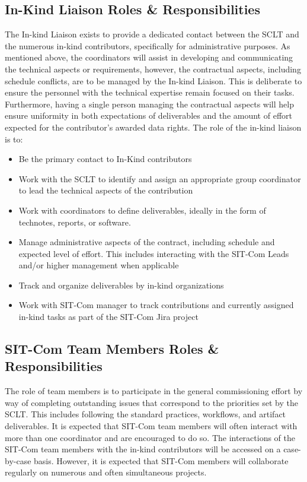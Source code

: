 \documentclass[SE,lsstdraft,authoryear,toc]{lsstdoc}
\begin{document}
\subsection{In-Kind Liaison Roles \& Responsibilities}
The In-kind Liaison exists to provide a dedicated contact between the SCLT and the numerous in-kind contributors, specifically for administrative purposes.
As mentioned above, the coordinators will assist in developing and communicating the technical aspects or requirements, however, the contractual aspects, including schedule conflicts, are to be managed by the In-kind Liaison.
This is deliberate to ensure the personnel with the technical expertise remain focused on their tasks.
Furthermore, having a single person managing the contractual aspects will help ensure uniformity in both expectations of deliverables and the amount of effort expected for the contributor's awarded data rights.
The role of the in-kind liaison is to:
\begin{itemize}
    \item Be the primary contact to In-Kind contributors
    \item Work with the SCLT to identify and assign an appropriate group coordinator to lead the technical aspects of the contribution
    \item Work with coordinators to define deliverables, ideally in the form of technotes, reports, or software.
    \item Manage administrative aspects of the contract, including schedule and expected level of effort.
    This includes interacting with the SIT-Com Leads and/or higher management when applicable
    \item Track and organize deliverables by in-kind organizations
    \item Work with SIT-Com manager to track contributions and currently assigned in-kind tasks as part of the SIT-Com Jira project
\end{itemize}

\subsection{SIT-Com Team Members Roles \& Responsibilities}
The role of team members is to participate in the general commissioning effort by way of completing outstanding issues that correspond to the priorities set by the SCLT.
This includes following the standard practices, workflows, and artifact deliverables.
It is expected that SIT-Com team members will often interact with more than one coordinator and are encouraged to do so.
The interactions of the SIT-Com team members with the in-kind contributors will be accessed on a case-by-case basis.
However, it is expected that SIT-Com members will collaborate regularly on numerous and often simultaneous projects.
\end{document}
